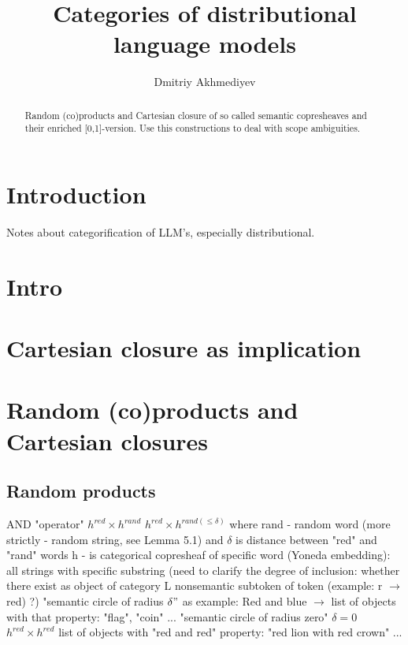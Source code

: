 \documentclass{article}
\title{Categories of distributional language models}
\author{Dmitriy Akhmediyev}
\begin{document}
\maketitle

\begin{abstract}
Random (co)products and Cartesian closure of so called semantic copresheaves and their enriched [0,1]-version.
Use this constructions to deal with scope ambiguities.
\end{abstract}

\section{Introduction}

Notes about categorification of LLM's, especially distributional.

\section{Intro}

\section{Cartesian closure as implication}

\section{Random (co)products and Cartesian closures}
\subsection{Random products}
AND "operator"
\newline
$h^{red} \times h^{rand}$
\newline
$h^{red} \times h^{rand(\leq \delta)}$
\newline
where
\newline
rand - random word (more strictly - random string, see Lemma 5.1)
\newline
and $\delta$ is distance between "red" and "rand" words
\newline
h - is categorical copresheaf of specific word (Yoneda embedding): all strings with specific substring
(need to clarify the degree of inclusion:
whether there exist as object of category L nonsemantic subtoken
of token (example: r $\xrightarrow{}$ red) ?)
\newline
\newline
"semantic circle of radius $\delta"$
\newline
as example:
\newline
Red and blue $\xrightarrow{}{}$ list of objects with that property: "flag", "coin" ...
\newline
\newline
"semantic circle of radius zero"
\newline
$\delta=0$
\newline
$h^{red} \times h^{red}$
\newline
list of objects with "red and red" property: "red lion with red crown" ...
\end{document}
